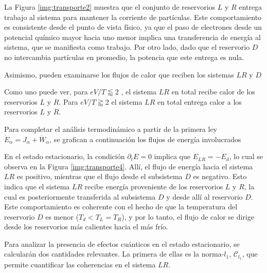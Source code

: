     
La Figura \ref{img:transporte2} muestra que el conjunto de reservorios \( L \) y \( R \) entrega trabajo al sistema para mantener la corriente de partículas. Este comportamiento es consistente desde el punto de vista físico, ya que el paso de electrones desde un potencial químico mayor hacia uno menor implica una transferencia de energía al sistema, que se manifiesta como trabajo. Por otro lado, dado que el reservorio \( D \) no intercambia partículas en promedio, la potencia que este entrega es nula.

 Asimismo, pueden examinarse los flujos de calor que reciben los sistemas $LR$ y $D$


    
Como uno puede ver, para $eV/T \lessapprox 2$ , el sistema $LR$ en total recibe calor de los reservorios $L$ y $R$. Para $eV/T \gtrapprox 2$ el sistema $LR$ en total entrega calor a los reservorios $L$ y $R$. 

Para completar el análisis termodinámico a partir de la primera ley $\dot{E}_{\alpha} = J_{\alpha} + \dot{W}_{\alpha}$, se grafican a continuación los flujos de energía involucrados


En el estado estacionario, la condición \( \partial_t E = 0 \) implica que \( \dot{E}_{LR} = -\dot{E}_d \), lo cual se observa en la Figura \ref{img:transporte4}. Allí, el flujo de energía hacia el sistema \( LR \) es positivo, mientras que el flujo desde el subsistema \( D \) es negativo. Esto indica que el sistema \( LR \) recibe energía proveniente de los reservorios \( L \) y \( R \), la cual es posteriormente transferida al subsistema \( D \) y desde allí al reservorio \( D \). Este comportamiento es coherente con el hecho de que la temperatura del reservorio \( D \) es menor (\( T_{d} < T_{L} = T_{R} \)), y por lo tanto, el flujo de calor se dirige desde los reservorios más calientes hacia el más frío.

Para analizar la presencia de efectos cuánticos en el estado estacionario, se calcularán dos cantidades relevantes. La primera de ellas es la norma-\( l_{1} \), \( \mathcal{C}_{l_{1}} \), que permite cuantificar las coherencias en el sistema \( LR \).


